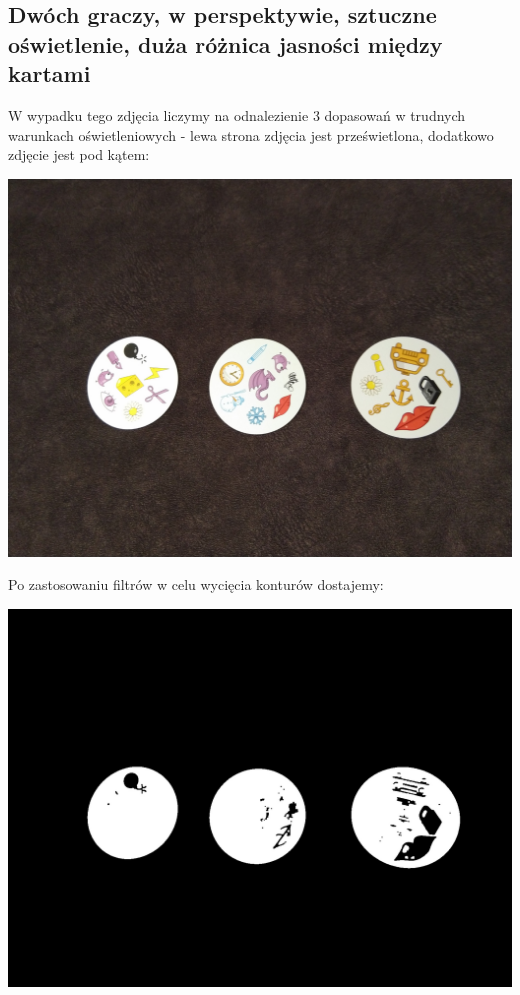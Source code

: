 \documentclass[10pt,a4paper]{article}
\begin{document}
\subsection{Dwóch graczy, w perspektywie, sztuczne oświetlenie, duża różnica jasności między kartami}
W wypadku tego zdjęcia liczymy na odnalezienie 3 dopasowań w trudnych warunkach oświetleniowych - lewa strona zdjęcia jest prześwietlona, dodatkowo zdjęcie jest pod kątem:\\
\begin{center}
\includegraphics[scale=0.25]{2.2/dobble11.jpg}
\end{center}
Po zastosowaniu filtrów w celu wycięcia konturów dostajemy:
\begin{center}
\includegraphics[scale=0.20]{2.2/th1.jpg}
\end{center}
\end{document}
